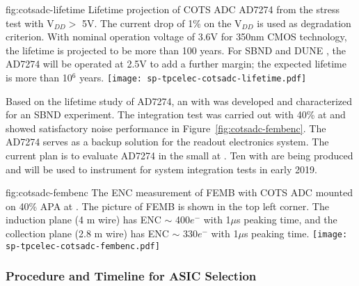 \begin{dunefigure}
{fig:cotsadc-lifetime}
	{Lifetime projection of COTS ADC AD7274 from the stress test with V$_{DD} >$ 5V. The current drop of 1\% on the V$_{DD}$ is used as degradation criterion. With nominal operation voltage of 3.6V for 350nm CMOS technology, the lifetime is projected to be more than 100 years. For SBND and DUNE , the AD7274 will be operated at 2.5V to add a further margin; the expected lifetime is more than 10$^6$ years.}
\texttt{[image: sp-tpcelec-cotsadc-lifetime.pdf]}
\end{dunefigure}

Based on the lifetime study of AD7274, an  with   was developed and characterized for an SBND experiment. The integration test was carried out with 40\%  at  and showed satisfactory noise performance in Figure~\ref{fig:cotsadc-fembenc}. The   AD7274 serves as a backup solution for the    readout electronics system. The current plan is to evaluate AD7274  in the small   at . Ten  with   are being produced and will be used to instrument   for system integration tests in early 2019. 

\begin{dunefigure}
{fig:cotsadc-fembenc}
	{The ENC measurement of FEMB with COTS ADC mounted on 40\% APA at . The picture of FEMB is shown in the top left corner. The induction plane (4 m wire) has ENC $\sim$ 400$e^-$ with 1$\mu$s peaking time, and the collection plane (2.8 m wire) has ENC $\sim$ 330$e^-$ with 1$\mu$s peaking time.}
\texttt{[image: sp-tpcelec-cotsadc-fembenc.pdf]}
\end{dunefigure}

\subsubsection{Procedure and Timeline for ASIC Selection}
\label{sec:fdsp-tpcelec-design-femb-selection}

